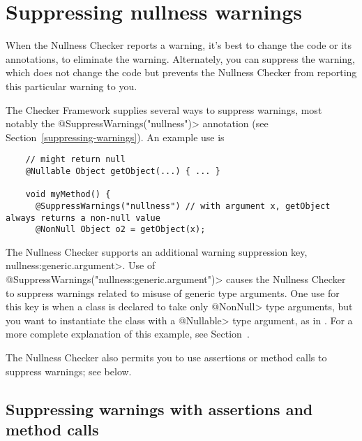 \section{Suppressing nullness warnings\label{suppressing-warnings-nullness}}

When the Nullness Checker reports a warning, it's best to change the code
or its annotations, to eliminate the warning.  Alternately, you can
suppress the warning, which does not change the code but prevents the
Nullness Checker from reporting this particular warning to you.

\begin{sloppypar}
The Checker Framework supplies several ways to suppress warnings, most
notably the \<@SuppressWarnings("nullness")> annotation (see
Section~\ref{suppressing-warnings}).  An example use is
\end{sloppypar}

\begin{smaller}
\begin{Verbatim}
    // might return null
    @Nullable Object getObject(...) { ... }

    void myMethod() {
      @SuppressWarnings("nullness") // with argument x, getObject always returns a non-null value
      @NonNull Object o2 = getObject(x);
\end{Verbatim}
\end{smaller}


The Nullness Checker supports an additional warning suppression key,
\<nullness:generic.argument>.
Use of \<@SuppressWarnings("nullness:generic.argument")> causes the Nullness
Checker to suppress warnings related to misuse of generic type
arguments.  One use for this key is when a class is declared to take only
\<@NonNull> type arguments, but you want to instantiate the class with a
\<@Nullable> type argument, as in .  For a more
complete explanation of this example, see
Section~.

The Nullness Checker also permits you to use assertions or method calls to
suppress warnings; see below.



\subsection{Suppressing warnings with assertions and method calls\label{suppressing-warnings-with-assertions}}

